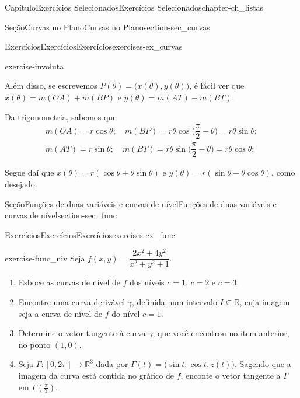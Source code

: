 \documentclass[oneside,10pt,]{book}
\numberwithin{equation}{section}
\newcommand{\R}{\mathbb R}
\begin{document}
\begin{chapterptx}{Capítulo}{Exercícios Selecionados}{}{Exercícios Selecionados}{}{}{chapter-ch_listas}
\begin{sectionptx}{Seção}{Curvas no Plano}{}{Curvas no Plano}{}{}{section-sec_curvas}
\begin{exercises-subsection-numberless}{Exercícios}{Exercícios}{}{Exercícios}{}{}{exercises-ex_curvas}
\begin{divisionexercise}{6}{}{}{exercise-involuta}
\par
Além disso, se escrevemos \(P(\theta)=\big(x(\theta),
y(\theta)\big)\), é fácil ver que \(x(\theta)=m(OA)+m(BP)\) e \(y(\theta)=m(AT)-m(BT)\).%
\par
Da trigonometria, sabemos que%
\begin{gather*}
m(OA)=r\cos\theta;\quad
m(BP)=r\theta\cos\big(\dfrac{\pi}{2}-\theta\big)=r\theta\sin\theta;\\
m(AT)=r\sin\theta;\quad
m(BT)=r\theta\sin\big(\dfrac{\pi}{2}-\theta\big)=r\theta\cos\theta;
\end{gather*}
%
\par
Segue daí que \(x(\theta)=r(\cos\theta+\theta\sin\theta)\) e \(y(\theta)=r(\sin\theta-\theta\cos\theta)\), como desejado.%
\end{divisionexercise}%
\end{exercises-subsection-numberless}
\end{sectionptx}
%
%
\typeout{************************************************}
\typeout{************************************************}
%
\begin{sectionptx}{Seção}{Funções de duas variáveis e curvas de nível}{}{Funções de duas variáveis e curvas de nível}{}{}{section-sec_func}
%
%
\typeout{************************************************}
\typeout{************************************************}
%
\begin{exercises-subsection-numberless}{Exercícios}{Exercícios}{}{Exercícios}{}{}{exercises-ex_func}
\begin{divisionexercise}{7}{}{}{exercise-func_niv}%
Seja \(f(x,y)=\dfrac{2x^2+4y^2}{x^2+y^2+1}\).%
\begin{enumerate}[label=\alph*.]
\item{}Esboce as curvas de nível de \(f\) dos níveis \(c=1\), \(c=2\) e \(c=3\).%
\item{}Encontre uma curva derivável \(\gamma\), definida num intervalo \(I\subseteq\R\), cuja imagem seja a curva de nível de \(f\) do nível \(c=1\).%
\item{}Determine o vetor tangente à curva \(\gamma\), que você encontrou no item anterior, no ponto \((1,0)\).%
\item{}Seja \(\Gamma\colon [0,2\pi]\to\R^3\) dada por \(\Gamma(t)=\big(\sin t, \cos t, z(t)\big)\). Sagendo que a imagem da curva está contida no gráfico de \(f\), enconte o vetor tangente a \(\Gamma\) em \(\Gamma(\frac{\pi}{3})\).%
\end{enumerate}

\end{divisionexercise}
\end{exercises-subsection-numberless}
\end{sectionptx}
\end{chapterptx}
\end{document}
